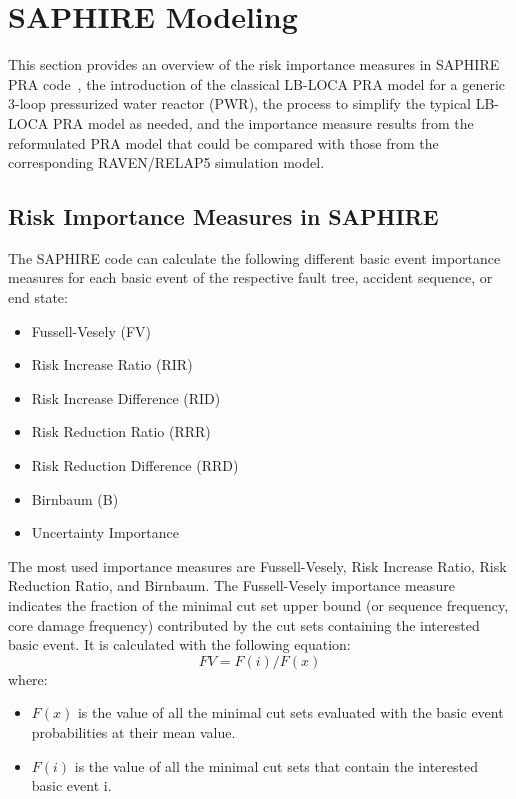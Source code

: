 \section{SAPHIRE Modeling}
\label{sec:SAPHIREmodeling}

This section provides an overview of the risk importance measures in SAPHIRE PRA 
code~\cite{saphire}, the introduction of the classical LB-LOCA PRA model 
for a generic 3-loop pressurized water reactor (PWR), the process to simplify the 
typical LB-LOCA PRA model as needed, and the importance measure results from the 
reformulated PRA model that could be compared with those from the corresponding 
RAVEN/RELAP5 simulation model. 

\subsection{Risk Importance Measures in SAPHIRE}

The SAPHIRE code can calculate the following different basic event importance 
measures for each basic event of the respective fault tree, accident sequence, 
or end state:
\begin{itemize}
	\item Fussell-Vesely (FV) 
	\item Risk Increase Ratio (RIR) 
	\item Risk Increase Difference (RID)
	\item Risk Reduction Ratio (RRR)
	\item Risk Reduction Difference (RRD)
	\item Birnbaum (B)
	\item Uncertainty Importance
\end{itemize}
The most used importance measures are Fussell-Vesely, Risk Increase Ratio, Risk 
Reduction Ratio, and Birnbaum. The Fussell-Vesely importance measure indicates 
the fraction of the minimal cut set upper bound (or sequence frequency, core damage 
frequency) contributed by the cut sets containing the interested basic event. 
It is calculated with the following equation:
\begin{equation}
FV = F(i) / F(x)
\end{equation}
where:
\begin{itemize}
    \item $F(x)$ is the value of all the minimal cut sets evaluated with the basic event probabilities at their mean value.
    \item $F(i)$ is the value of all the minimal cut sets that contain the interested basic event i.
\end{itemize}

